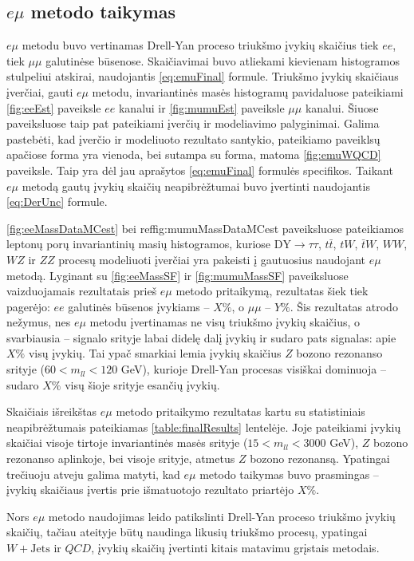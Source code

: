 \documentclass[a4paper, 12pt]{article}
\newcommand{\tbarW}{\bar{t}W}
\newcommand{\ttbar}{t\bar{t}}
\newcommand{\emu}{e\mu}
\newcommand{\mumu}{\mu\mu}
\newcommand{\WJets}{W\! +\!\mathrm{Jets}}
\newcommand{\DYtau}{\mathrm{DY} \! \rightarrow \! \tau\tau}
\newcommand{\QCD}{QC\! D}
\newlength\q
\begin{document}
\subsection{$\emu$ metodo taikymas}

$\emu$ metodu buvo vertinamas Drell-Yan proceso triukšmo įvykių skaičius tiek $ee$, tiek $\mumu$ galutinėse būsenose.
Skaičiavimai buvo atliekami kievienam histogramos stulpeliui atskirai, naudojantis \eqref{eq:emuFinal} formule.
Triukšmo įvykių skaičiaus įverčiai, gauti $\emu$ metodu, invariantinės masės histogramų pavidaluose pateikiami
\ref{fig:eeEst} paveiksle $ee$ kanalui ir \ref{fig:mumuEst} paveiksle $\mumu$ kanalui.
Šiuose paveiksluose taip pat pateikiami įverčių ir modeliavimo palyginimai.
Galima pastebėti, kad įverčio ir modeliuoto rezultato santykio, pateikiamo paveiklsų apačiose forma yra vienoda, bei
sutampa su forma, matoma \ref{fig:emuWQCD} paveiksle.
Taip yra dėl jau aprašytos \eqref{eq:emuFinal} formulės specifikos.
Taikant $\emu$ metodą gautų įvykių skaičių neapibrėžtumai buvo įvertinti naudojantis \ref{eq:DerUnc} formule.

\ref{fig:eeMassDataMCest} bei ref{fig:mumuMassDataMCest} paveiksluose pateikiamos leptonų porų invariantinių masių
histogramos, kuriose $\DYtau$, $\ttbar$, $tW$, $\tbarW$, $WW$, $WZ$ ir $ZZ$ procesų modeliuoti įverčiai yra pakeisti
į gautuosius naudojant $\emu$ metodą.
Lyginant su \ref{fig:eeMassSF} ir \ref{fig:mumuMassSF} paveiksluose vaizduojamais rezultatais prieš $\emu$ metodo
pritaikymą, rezultatas šiek tiek pagerėjo: $ee$ galutinės būsenos įvykiams -- $X\%$, o $\mumu$ -- $Y\%$.
Šis rezultatas atrodo nežymus, nes $\emu$ metodu įvertinamas ne visų triukšmo įvykių skaičius, o svarbiausia --
signalo srityje labai didelę dalį įvykių ir sudaro pats signalas: apie $X\%$ visų įvykių.
Tai ypač smarkiai lemia įvykių skaičius $Z$ bozono rezonanso srityje ($60<m_{ll}<120$ GeV), kurioje Drell-Yan procesas
visiškai dominuoja -- sudaro $X\%$ visų šioje srityje esančių įvykių.

Skaičiais išreikštas $\emu$ metodo pritaikymo rezultatas kartu su statistiniais neapibrėžtumais pateikiamas
\ref{table:finalResults} lentelėje. Joje pateikiami įvykių skaičiai visoje tirtoje invariantinės masės srityje
($15<m_{ll}<3000$ GeV), $Z$ bozono rezonanso aplinkoje, bei visoje srityje, atmetus $Z$ bozono rezonansą.
Ypatingai trečiuoju atveju galima matyti, kad $\emu$ metodo taikymas buvo prasmingas -- įvykių skaičiaus įvertis
prie išmatuotojo rezultato priartėjo $X\%$.

Nors $\emu$ metodo naudojimas leido patikslinti Drell-Yan proceso triukšmo įvykių skaičių, tačiau ateityje būtų
naudinga likusių triukšmo procesų, ypatingai $\WJets$ ir $\QCD$, įvykių skaičių įvertinti kitais matavimu grįstais
metodais.
\end{document}
